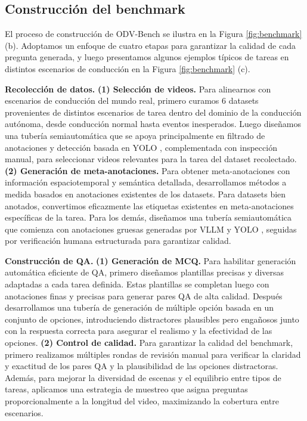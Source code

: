 

\subsection{Construcción del benchmark}
El proceso de construcción de ODV-Bench se ilustra en la Figura \ref{fig:benchmark} (b). Adoptamos un enfoque de cuatro etapas para garantizar la calidad de cada pregunta generada, y luego presentamos algunos ejemplos típicos de tareas en distintos escenarios de conducción en la Figura \ref{fig:benchmark} (c).

\textbf{Recolección de datos.} \textbf{(1) Selección de videos.} Para alinearnos con escenarios de conducción del mundo real, primero curamos 6 datasets \cite{khan2024road,fang2024abductive,zurn2024wayvescenes101,yu2020bdd100k,zhang2023videotext,che2019d} provenientes de distintos escenarios de tarea dentro del dominio de la conducción autónoma, desde conducción normal hasta eventos inesperados. Luego diseñamos una tubería semiautomática que se apoya principalmente en filtrado de anotaciones y detección basada en YOLO \cite{khanam2024yolov11}, complementada con inspección manual, para seleccionar videos relevantes para la tarea del dataset recolectado. \textbf{(2) Generación de meta-anotaciones.} Para obtener meta-anotaciones con información espaciotemporal y semántica detallada, desarrollamos métodos a medida basados en anotaciones existentes de los datasets. Para datasets bien anotados, convertimos eficazmente las etiquetas existentes en meta-anotaciones específicas de la tarea. Para los demás, diseñamos una tubería semiautomática que comienza con anotaciones gruesas generadas por VLLM y YOLO \cite{khanam2024yolov11}, seguidas por verificación humana estructurada para garantizar calidad.

\textbf{Construcción de QA.} \textbf{(1) Generación de MCQ.} Para habilitar generación automática eficiente de QA, primero diseñamos plantillas precisas y diversas adaptadas a cada tarea definida. Estas plantillas se completan luego con anotaciones finas y precisas para generar pares QA de alta calidad. Después desarrollamos una tubería de generación de múltiple opción basada en un conjunto de opciones, introduciendo distractores plausibles pero engañosos junto con la respuesta correcta para asegurar el realismo y la efectividad de las opciones. \textbf{(2) Control de calidad.} Para garantizar la calidad del benchmark, primero realizamos múltiples rondas de revisión manual para verificar la claridad y exactitud de los pares QA y la plausibilidad de las opciones distractoras. Además, para mejorar la diversidad de escenas y el equilibrio entre tipos de tareas, aplicamos una estrategia de muestreo que asigna preguntas proporcionalmente a la longitud del video, maximizando la cobertura entre escenarios.

